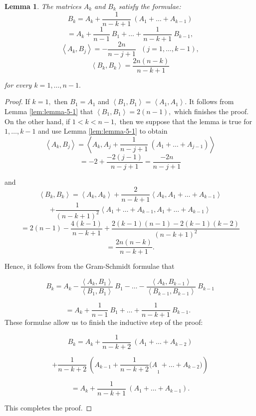 \documentclass[10pt,a4paper]{amsart}
\newtheorem{lemma}{Lemma}
\begin{document}
\begin{lemma}
\label{lem:lem-5-2}The matrices $A_{k}$ and $B_{k}$ satisfy the
formulae: 
\[
B_{k}=A_{k}+\frac{1}{n-k+1}\ \left(A_{1}+\dots+A_{k-1}\right)
\]
\[
=A_{k}+\frac{1}{n-1}\ B_{1}+\dots+\frac{1}{n-k+1}\ B_{k-1},
\]
\[
\left\langle A_{k},B_{j}\right\rangle =-\frac{2n}{n-j+1}\ \ \ \left(j=1,\dots,k-1\right),
\]
\[
\left\langle B_{k},B_{k}\right\rangle =\frac{2n(n-k)}{n-k+1}
\]

for every $k=1,\dots,n-1.$
\end{lemma}

\begin{proof}
If $k=1,$ then $B_{1}=A_{1}$ and $\left\langle B_{1},B_{1}\right\rangle =\left\langle A_{1},A_{1}\right\rangle .$
It follows from Lemma \ref{lem:lemma-5-1} that $\left\langle B_{1},B_{1}\right\rangle =2\left(n-1\right),$
which finishes the proof. On the other hand, if $1<k<n-1,$ then we
suppose that the lemma is true for $1,\dots,k-1$ and use Lemma \ref{lem:lemma-5-1}
to obtain 
\[
\left\langle A_{k},B_{j}\right\rangle =\left\langle A_{k},A_{j}+\frac{1}{n-j+1}\ \left(A_{1}+\dots+A_{j-1}\right)\right\rangle 
\]
\[
=-2+\frac{-2\left(j-1\right)}{n-j+1}=\frac{-2n}{n-j+1}
\]

and 
\[
\left\langle B_{k},B_{k}\right\rangle =\left\langle A_{k},A_{k}\right\rangle +\frac{2}{n-k+1}\left\langle A_{k},A_{1}+\dots+A_{k-1}\right\rangle 
\]
\[
+\frac{1}{{(n-k+1)}^{2}}\left\langle A_{1}+\dots+A_{k-1},A_{1}+\dots+A_{k-1}\right\rangle 
\]
\[
=2\left(n-1\right)-\frac{4\left(k-1\right)}{n-k+1}+\frac{2\left(k-1\right)\left(n-1\right)-2(k-1)(k-2)}{{(n-k+1)}^{2}}
\]
 {}
\[
=\frac{2n(n-k)}{n-k+1}.
\]

\noindent Hence, it follows from the Gram-Schmidt formulae that

\noindent
\[
B_{k}=A_{k}-\frac{\left\langle A_{k},B_{1}\right\rangle }{\left\langle B_{1},B_{1}\right\rangle }\ B_{1}-\dots-\frac{\left\langle A_{k},B_{k-1}\right\rangle }{\left\langle B_{k-1},B_{k-1}\right\rangle }\ B_{k-1}
\]

\[
=A_{k}+\frac{1}{n-1}\ B_{1}+\dots+\frac{1}{n-k+1}\ B_{k-1}.\ \ \ 
\]
These formulae allow us to finish the inductive step of the proof:

\noindent
\[
B_{k}=A_{k}+\frac{1}{n-k+2}\ \left(A_{1}+\dots+A_{k-2}\right)
\]

\[
+\frac{1}{n-k+2}\ \left(A_{k-1}+{\frac{1}{n-k+2}(A}_{1}+\dots+A_{k-2})\right)
\]

\[
=A_{k}+\frac{1}{n-k+1}\ \left(A_{1}+\dots+A_{k-1}\right).
\]

\noindent This completes the proof.
\end{proof}
\end{document}
